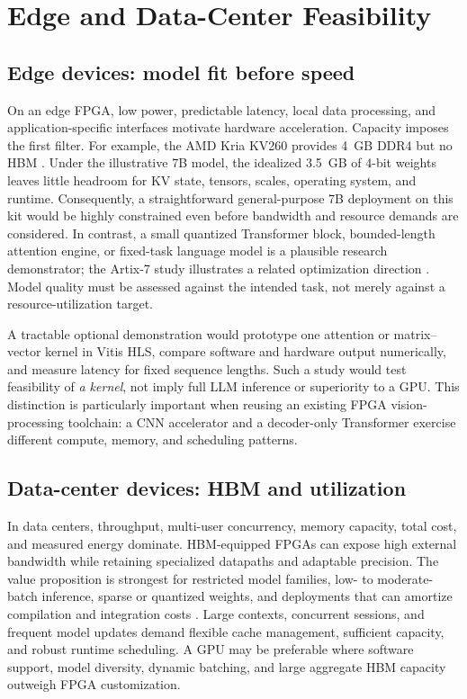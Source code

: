 \documentclass[conference,10pt]{IEEEtran}
\begin{document}
\section{Edge and Data-Center Feasibility}
\subsection{Edge devices: model fit before speed}
On an edge FPGA, low power, predictable latency, local data processing, and application-specific interfaces motivate hardware acceleration. Capacity imposes the first filter. For example, the AMD Kria KV260 provides 4~GB DDR4 but no HBM \cite{amdKV260}. Under the illustrative 7B model, the idealized 3.5~GB of 4-bit weights leaves little headroom for KV state, tensors, scales, operating system, and runtime. Consequently, a straightforward general-purpose 7B deployment on this kit would be highly constrained even before bandwidth and resource demands are considered. In contrast, a small quantized Transformer block, bounded-length attention engine, or fixed-task language model is a plausible research demonstrator; the Artix-7 study illustrates a related optimization direction \cite{chae2025}. Model quality must be assessed against the intended task, not merely against a resource-utilization target.

A tractable optional demonstration would prototype one attention or matrix--vector kernel in Vitis HLS, compare software and hardware output numerically, and measure latency for fixed sequence lengths. Such a study would test feasibility of \emph{a kernel}, not imply full LLM inference or superiority to a GPU. This distinction is particularly important when reusing an existing FPGA vision-processing toolchain: a CNN accelerator and a decoder-only Transformer exercise different compute, memory, and scheduling patterns.

\subsection{Data-center devices: HBM and utilization}
In data centers, throughput, multi-user concurrency, memory capacity, total cost, and measured energy dominate. HBM-equipped FPGAs can expose high external bandwidth while retaining specialized datapaths and adaptable precision. The value proposition is strongest for restricted model families, low- to moderate-batch inference, sparse or quantized weights, and deployments that can amortize compilation and integration costs \cite{zeng2024,huang2025}. Large contexts, concurrent sessions, and frequent model updates demand flexible cache management, sufficient capacity, and robust runtime scheduling. A GPU may be preferable where software support, model diversity, dynamic batching, and large aggregate HBM capacity outweigh FPGA customization.
\end{document}
